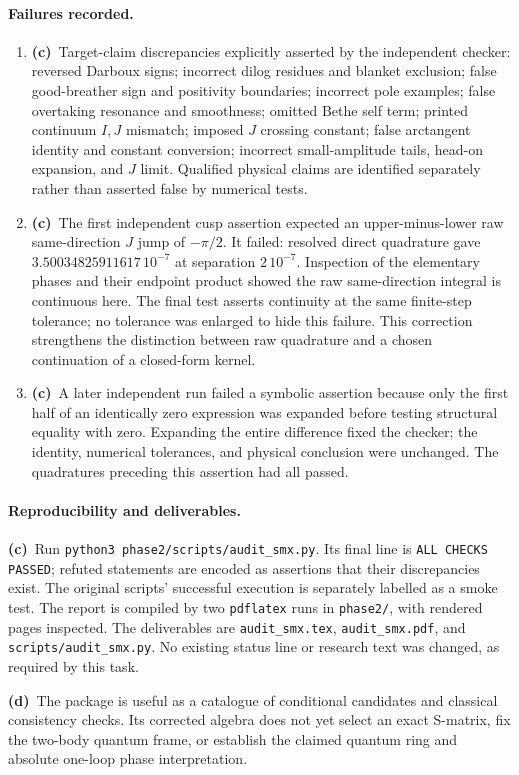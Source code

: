 \documentclass[11pt,a4paper]{article}
\newcommand{\Lc}{\textbf{(c)}\ }
\newcommand{\Ld}{\textbf{(d)}\ }
\begin{document}
\paragraph{Failures recorded.}
\begin{enumerate}
\item \Lc Target-claim discrepancies explicitly asserted by the independent
checker: reversed Darboux signs; incorrect dilog residues and blanket
exclusion; false good-breather sign and positivity boundaries; incorrect pole
examples; false overtaking resonance and smoothness; omitted Bethe self
term; printed continuum $I,J$ mismatch; imposed $J$ crossing constant;
false arctangent identity and constant conversion; incorrect small-amplitude
tails, head-on expansion, and $J$ limit. Qualified physical claims are
identified separately rather than asserted false by numerical tests.
\item \Lc The first independent cusp assertion expected an upper-minus-lower
raw same-direction $J$ jump of $-\pi/2$. It failed: resolved direct quadrature
gave $3.50034825911617\,10^{-7}$ at separation $2\,10^{-7}$. Inspection of
the elementary phases and their endpoint product showed the raw same-direction
integral is continuous here. The final test asserts continuity at the same
finite-step tolerance; no tolerance was enlarged to hide this failure.
This correction strengthens the distinction between raw quadrature and a
chosen continuation of a closed-form kernel.
\item \Lc A later independent run failed a symbolic assertion because only
the first half of an identically zero expression was expanded before testing
structural equality with zero. Expanding the entire difference fixed the
checker; the identity, numerical tolerances, and physical conclusion were
unchanged. The quadratures preceding this assertion had all passed.
\end{enumerate}

\paragraph{Reproducibility and deliverables.}
\Lc Run \texttt{python3 phase2/scripts/audit\_smx.py}. Its final line is
\texttt{ALL CHECKS PASSED}; refuted statements are encoded as assertions
that their discrepancies exist. The original scripts' successful execution
is separately labelled as a smoke test. The report is compiled by two
\texttt{pdflatex} runs in \texttt{phase2/}, with rendered pages inspected.
The deliverables are \texttt{audit\_smx.tex}, \texttt{audit\_smx.pdf}, and
\texttt{scripts/audit\_smx.py}. No existing status line or research text was
changed, as required by this task.

\Ld The package is useful as a catalogue of conditional candidates and
classical consistency checks. Its corrected algebra does not yet select
an exact S-matrix, fix the two-body quantum frame, or establish the claimed
quantum ring and absolute one-loop phase interpretation.
\end{document}
